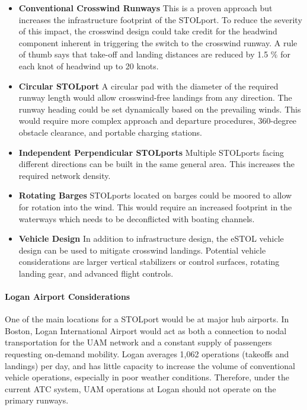 \documentclass[]{aiaa-tc}%
\begin{document}
\begin{itemize}
\item \textbf{Conventional Crosswind Runways}  This is a proven approach but increases the infrastructure footprint of the STOLport. To reduce the severity of this impact, the crosswind design could take credit for the headwind component inherent in triggering the switch to the crosswind runway. A rule of thumb says that take-off and landing distances are reduced by 1.5 $\%$  for each knot of headwind up to 20 knots\cite{Headwind}. 
\item \textbf{Circular STOLport} A circular pad with the diameter of the required runway length would allow crosswind-free landings from any direction.  The runway heading could be set dynamically based on the prevailing winds. This would require more complex approach and departure procedures, 360-degree obstacle clearance, and portable charging stations. 
\item \textbf{Independent Perpendicular STOLports} Multiple STOLports facing different directions can be built in the same general area.  This increases the required network density. 

\item \textbf{Rotating Barges} STOLports located on barges could be moored to allow for rotation into the wind. This would require an increased footprint in the waterways which needs to be deconflicted with boating channels.

\item \textbf{Vehicle Design} In addition to infrastructure design, the eSTOL vehicle design can be used to mitigate crosswind landings. Potential vehicle considerations are larger vertical stabilizers or control surfaces, rotating landing gear, and advanced flight controls.
\end{itemize}
\paragraph{Logan Airport Considerations}
One of the main locations for a STOLport would be at major hub airports. In Boston, Logan International Airport would act as both a connection to nodal transportation for the UAM network and a constant supply of passengers requesting on-demand mobility. Logan averages 1,062 operations (takeoffs and landings) per day\cite{LoganStats}, and has little capacity to increase the volume of conventional vehicle operations, especially in poor weather conditions\cite{LoganOps}. Therefore, under the current ATC system, UAM operations at Logan should not operate on the primary runways.
\end{document}
